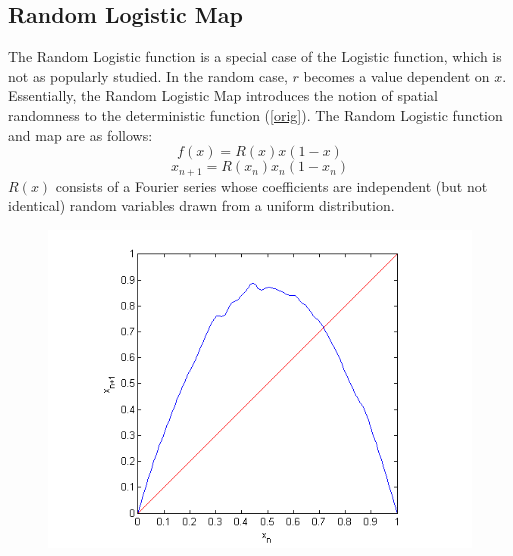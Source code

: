 \documentclass[12pt]{article}
\begin{document}
\subsection{Random Logistic Map}
The Random Logistic function is a special case of the Logistic
function, which is not as popularly studied. In the random case, $r$ becomes a value dependent on $x$. Essentially, the Random Logistic
Map introduces the notion of spatial randomness to the deterministic
function (\ref{orig}). The Random Logistic function and map are as follows:
\begin{equation*}
f(x) = R(x)x(1-x)
\end{equation*}
\begin{equation}\label{randmap}
x_{n+1} = R(x_n)x_n(1-x_n)
\end{equation}
$R(x)$ consists of a Fourier series whose coefficients are independent
(but not identical) random variables drawn from a uniform
distribution. 
\begin{figure}[H]
	\begin{center}
		\includegraphics[scale=0.7]{random_cobweb}
	\end{center}
\end{figure}
\end{document}
